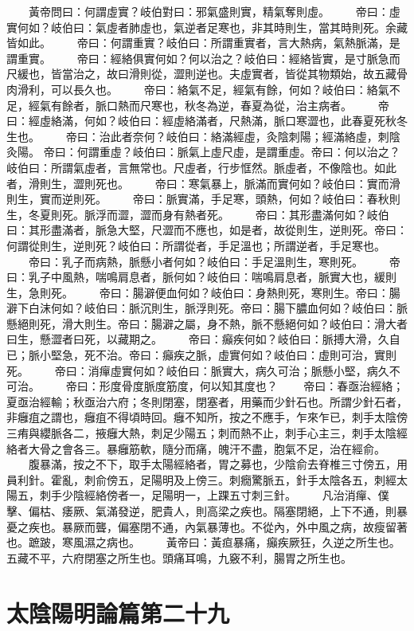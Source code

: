 　　黃帝問曰：何謂虛實？岐伯對曰：邪氣盛則實，精氣奪則虛。
　　帝曰：虛實何如？岐伯曰：氣虛者肺虛也，氣逆者足寒也，非其時則生，當其時則死。余藏皆如此。
　　帝曰：何謂重實？岐伯曰：所謂重實者，言大熱病，氣熱脈滿，是謂重實。
　　帝曰：經絡俱實何如？何以治之？岐伯曰：經絡皆實，是寸脈急而尺緩也，皆當治之，故曰滑則從，澀則逆也。夫虛實者，皆從其物類始，故五藏骨肉滑利，可以長久也。
　　帝曰：絡氣不足，經氣有餘，何如？岐伯曰：絡氣不足，經氣有餘者，脈口熱而尺寒也，秋冬為逆，春夏為從，治主病者。
　　帝曰：經虛絡滿，何如？岐伯曰：經虛絡滿者，尺熱滿，脈口寒澀也，此春夏死秋冬生也。
　　帝曰：治此者奈何？岐伯曰：絡滿經虛，灸陰刺陽；經滿絡虛，刺陰灸陽。 帝曰：何謂重虛？岐伯曰：脈氣上虛尺虛，是謂重虛。帝曰：何以治之？岐伯曰：所謂氣虛者，言無常也。尺虛者，行步恇然。脈虛者，不像陰也。如此者，滑則生，澀則死也。
　　帝曰：寒氣暴上，脈滿而實何如？岐伯曰：實而滑則生，實而逆則死。
　　帝曰：脈實滿，手足寒，頭熱，何如？岐伯曰：春秋則生，冬夏則死。脈浮而澀，澀而身有熱者死。
　　帝曰：其形盡滿何如？岐伯曰：其形盡滿者，脈急大堅，尺澀而不應也，如是者，故從則生，逆則死。帝曰：何謂從則生，逆則死？岐伯曰：所謂從者，手足溫也；所謂逆者，手足寒也。
　　帝曰：乳子而病熱，脈懸小者何如？岐伯曰：手足溫則生，寒則死。
　　帝曰：乳子中風熱，喘鳴肩息者，脈何如？岐伯曰：喘鳴肩息者，脈實大也，緩則生，急則死。
　　帝曰：腸澼便血何如？岐伯曰：身熱則死，寒則生。帝曰：腸澼下白沫何如？岐伯曰：脈沉則生，脈浮則死。帝曰：腸下膿血何如？岐伯曰：脈懸絕則死，滑大則生。帝曰：腸澼之屬，身不熱，脈不懸絕何如？岐伯曰：滑大者曰生，懸澀者曰死，以藏期之。
　　帝曰：癲疾何如？岐伯曰：脈搏大滑，久自已；脈小堅急，死不治。帝曰：癲疾之脈，虛實何如？岐伯曰：虛則可治，實則死。
　　帝曰：消癉虛實何如？岐伯曰：脈實大，病久可治；脈懸小堅，病久不可治。
　　帝曰：形度骨度脈度筋度，何以知其度也？
　　帝曰：春亟治經絡；夏亟治經輸；秋亟治六府；冬則閉塞，閉塞者，用藥而少針石也。所謂少針石者，非癰疽之謂也，癰疽不得頃時回。癰不知所，按之不應手，乍來乍已，刺手太陰傍三痏與纓脈各二，掖癰大熱，刺足少陽五；刺而熱不止，刺手心主三，刺手太陰經絡者大骨之會各三。暴癰筋軟，隨分而痛，魄汗不盡，胞氣不足，治在經俞。
　　腹暴滿，按之不下，取手太陽經絡者，胃之募也，少陰俞去脊椎三寸傍五，用員利針。霍亂，刺俞傍五，足陽明及上傍三。刺癇驚脈五，針手太陰各五，刺經太陽五，刺手少陰經絡傍者一，足陽明一，上踝五寸刺三針。
　　凡治消癉、僕擊、偏枯、痿厥、氣滿發逆，肥貴人，則高梁之疾也。隔塞閉絕，上下不通，則暴憂之疾也。暴厥而聾，偏塞閉不通，內氣暴薄也。不從內，外中風之病，故瘦留著也。蹠跛，寒風濕之病也。
　　黃帝曰：黃疸暴痛，癲疾厥狂，久逆之所生也。五藏不平，六府閉塞之所生也。頭痛耳鳴，九竅不利，腸胃之所生也。


\section{太陰陽明論篇第二十九}

